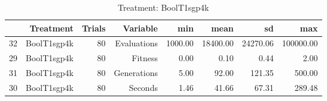 \begin{table}[ht]
\centering
\begin{tabular}{rrrrrrrr}
  \hline
 & Treatment & Trials & Variable & min & mean & sd & max \\ 
  \hline
32 & BoolT1sgp4k &  80 & Evaluations & 1000.00 & 18400.00 & 24270.06 & 100000.00 \\ 
  29 & BoolT1sgp4k &  80 & Fitness & 0.00 & 0.10 & 0.44 & 2.00 \\ 
  31 & BoolT1sgp4k &  80 & Generations & 5.00 & 92.00 & 121.35 & 500.00 \\ 
  30 & BoolT1sgp4k &  80 & Seconds & 1.46 & 41.66 & 67.31 & 289.48 \\ 
   \hline
\end{tabular}
\caption{Treatment: BoolT1sgp4k} 
\end{table}
